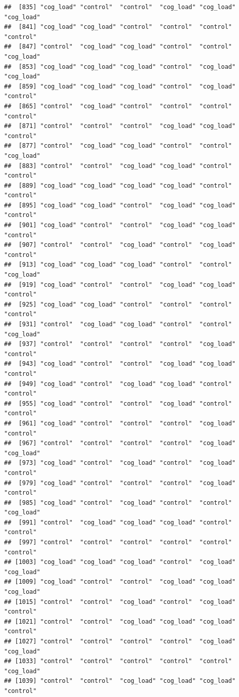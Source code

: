 \documentclass[
  american,
  man,floatsintext]{apa7}
\begin{document}
\begin{verbatim}
##  [835] "cog_load" "control"  "control"  "cog_load" "cog_load" "cog_load"
##  [841] "cog_load" "cog_load" "control"  "control"  "control"  "control" 
##  [847] "control"  "cog_load" "cog_load" "control"  "control"  "cog_load"
##  [853] "cog_load" "cog_load" "cog_load" "control"  "cog_load" "cog_load"
##  [859] "cog_load" "cog_load" "cog_load" "control"  "cog_load" "control" 
##  [865] "control"  "cog_load" "control"  "control"  "control"  "control" 
##  [871] "control"  "control"  "control"  "cog_load" "cog_load" "control" 
##  [877] "control"  "cog_load" "cog_load" "control"  "control"  "cog_load"
##  [883] "control"  "control"  "cog_load" "cog_load" "control"  "control" 
##  [889] "cog_load" "cog_load" "cog_load" "cog_load" "control"  "control" 
##  [895] "cog_load" "cog_load" "control"  "cog_load" "cog_load" "control" 
##  [901] "cog_load" "control"  "control"  "cog_load" "cog_load" "control" 
##  [907] "control"  "control"  "cog_load" "control"  "cog_load" "control" 
##  [913] "cog_load" "cog_load" "cog_load" "control"  "control"  "cog_load"
##  [919] "cog_load" "control"  "control"  "cog_load" "cog_load" "control" 
##  [925] "cog_load" "cog_load" "control"  "control"  "control"  "control" 
##  [931] "control"  "cog_load" "cog_load" "control"  "control"  "cog_load"
##  [937] "control"  "control"  "control"  "control"  "cog_load" "control" 
##  [943] "cog_load" "control"  "control"  "cog_load" "cog_load" "control" 
##  [949] "cog_load" "control"  "cog_load" "cog_load" "control"  "control" 
##  [955] "cog_load" "control"  "control"  "cog_load" "control"  "control" 
##  [961] "cog_load" "control"  "control"  "control"  "cog_load" "control" 
##  [967] "control"  "control"  "control"  "control"  "cog_load" "cog_load"
##  [973] "cog_load" "control"  "cog_load" "control"  "cog_load" "control" 
##  [979] "cog_load" "control"  "control"  "control"  "cog_load" "control" 
##  [985] "cog_load" "control"  "cog_load" "control"  "control"  "cog_load"
##  [991] "control"  "cog_load" "cog_load" "cog_load" "control"  "control" 
##  [997] "control"  "control"  "control"  "control"  "control"  "control" 
## [1003] "cog_load" "cog_load" "cog_load" "control"  "cog_load" "cog_load"
## [1009] "cog_load" "control"  "control"  "cog_load" "cog_load" "cog_load"
## [1015] "control"  "control"  "cog_load" "control"  "cog_load" "control" 
## [1021] "control"  "control"  "cog_load" "cog_load" "cog_load" "control" 
## [1027] "control"  "control"  "control"  "control"  "cog_load" "cog_load"
## [1033] "control"  "control"  "control"  "control"  "control"  "cog_load"
## [1039] "control"  "control"  "cog_load" "cog_load" "cog_load" "control" 

\end{verbatim}
\end{document}
